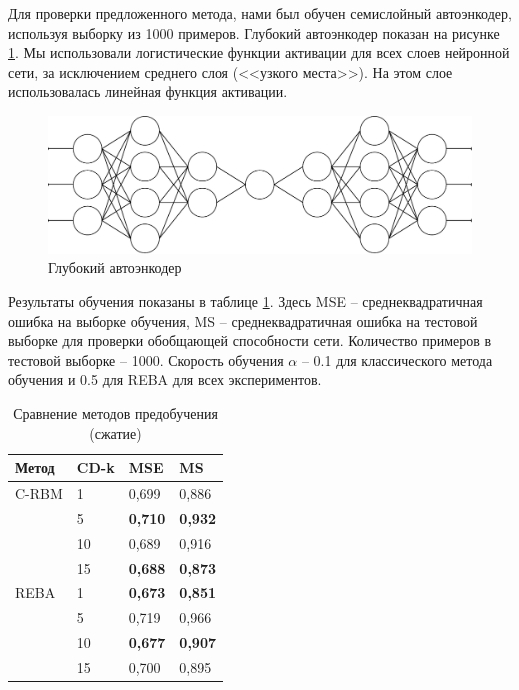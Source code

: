 Для проверки предложенного метода, нами был обучен семислойный автоэнкодер, используя выборку из 1000 примеров. Глубокий автоэнкодер показан на рисунке \ref{fig:autoencoder}. Мы использовали логистические функции активации для всех слоев нейронной сети, за исключением среднего слоя (<<узкого места>>). На этом слое использовалась линейная функция активации.

\begin{figure}[ht]
	\centering
	\includegraphics[width=16cm]{man-source/images/ch3/pic3-5.pdf}
	\caption{Глубокий автоэнкодер}
	\label{fig:autoencoder}
\end{figure}

Результаты обучения показаны в таблице \ref{table:data_compressing}. Здесь MSE -- среднеквадратичная ошибка на выборке обучения, MS -- среднеквадратичная ошибка на тестовой выборке для проверки обобщающей способности сети. Количество примеров в тестовой выборке -- 1000. Скорость обучения $\alpha$ -- 0.1 для классического метода обучения и 0.5 для REBA для всех экспериментов.

			\begin{table}[h]
				\caption{Сравнение методов предобучения (сжатие)}								\label{table:data_compressing}
				\centering
				\begin{tabular}{|p{4cm}|p{3cm}|p{2cm}|p{2cm}|}
					\hline
					Метод & CD-k & MSE & MS \\
					\hline
					C-RBM & 1  & 0,699 & 0,886 \\
                        \cline{2-4}
					& 5  & \textbf{0,710} & \textbf{0,932}\\
                        \cline{2-4}							
					&	10 & 0,689 & 0,916\\
					\cline{2-4}
                        &	15 & \textbf{0,688} & \textbf{0,873}\\ \hline
					REBA& 1  & \textbf{0,673} & \textbf{0,851}\\
                        \cline{2-4}
					& 5  & 0,719 & 0,966\\
                        \cline{2-4}
					&	10 & \textbf{0,677} & \textbf{0,907}\\
                        \cline{2-4}
					&	15 & 0,700 & 0,895 \\						
					\hline
				\end{tabular}			
			\end{table}	

